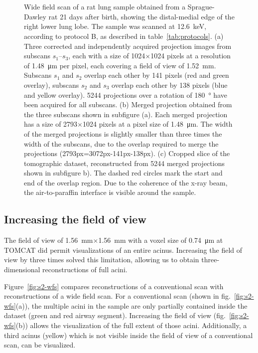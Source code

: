 	\begin{figure}[htp]%
		\\%
		\\%
		\caption{%
			Wide field scan of a rat lung sample obtained from a Sprague-Dawley rat 21 days after birth, showing the distal-medial edge of the right lower lung lobe. The sample was scanned at \SI{12.6}{\kilo\electronvolt}, according to protocol B, as described in table~\ref{tab:protocols}. %
			(a) Three corrected and independently acquired projection images from subscans $s_1$--$s_3$, each with a size of 1024\(\times\)1024 pixels at a resolution of \SI{1.48}{\micro\meter} per pixel, each covering a field of view of \SI{1.52}{\milli\meter}. Subscans $s_1$ and $s_2$ overlap each other by 141 pixels (red and green overlay), subscans $s_2$ and $s_3$ overlap each other by 138 pixels (blue and yellow overlay). 5244 projections over a rotation of \SI{180}{\degree} have been acquired for all subscans. %
			(b) Merged projection obtained from the three subscans shown in subfigure (a). Each merged projection has a size of 2793\(\times\)1024 pixels at a pixel size of \SI{1.48}{\micro\meter}. The width of the merged projections is slightly smaller than three times the width of the subscans, due to the overlap required to merge the projections (2793px=3072px-141px-138px). %
			(c) Cropped slice of the tomographic dataset, reconstructed from 5244 merged projections shown in subfigure b). The dashed red circles mark the start and end of the overlap region. Due to the coherence of the x-ray beam, the air-to-paraffin interface is visible around the sample.%
			}%
		\label{fig:wide field scan results}%
	\end{figure}
\fi

\subsection{Increasing the field of view}
The field of view of \SI{1.56}{\milli\meter}$\times$\SI{1.56}{\milli\meter} with a voxel size of \SI{0.74}{\micro\meter} at TOMCAT did permit visualizations of an entire acinus. Increasing the field of view by three times solved this limitation, allowing us to obtain three-dimensional reconstructions of full acini.

Figure~\ref{fig:s2-wfs} compares reconstructions of a conventional scan with reconstructions of a wide field scan. For a conventional scan (shown in fig.~\ref{fig:s2-wfs}(a)), the multiple acini in the sample are only partially contained inside the dataset (green and red airway segment). Increasing the field of view (fig.~\ref{fig:s2-wfs}(b)) allows the visualization of the full extent of those acini. Additionally, a third acinus (yellow) which is not visible inside the field of view of a conventional scan, can be visualized.

